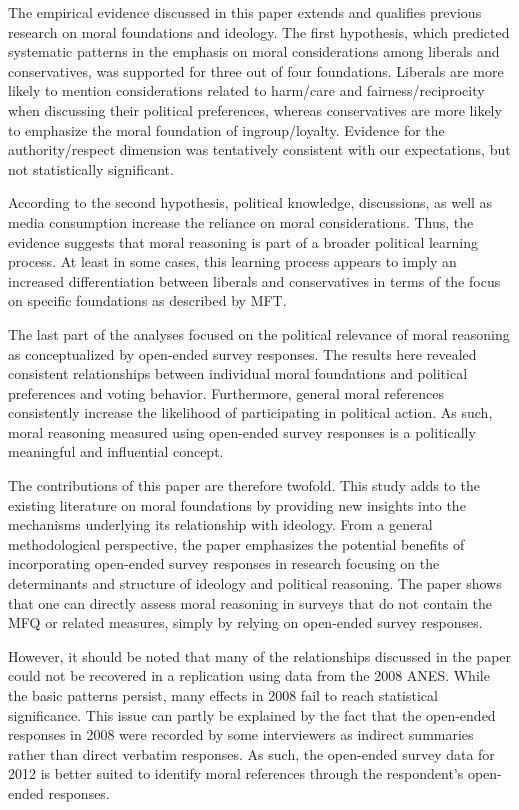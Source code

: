\documentclass[12pt]{article}
\begin{document}
The empirical evidence discussed in this paper extends and qualifies previous research on moral foundations and ideology. The first hypothesis, which predicted systematic patterns in the emphasis on moral considerations among liberals and conservatives, was supported for three out of four foundations. Liberals are more likely to mention considerations related to harm/care and fairness/reciprocity when discussing their political preferences, whereas conservatives are more likely to emphasize the moral foundation of ingroup/loyalty. Evidence for the authority/respect dimension was tentatively consistent with our expectations, but not statistically significant.

According to the second hypothesis, political knowledge, discussions, as well as media consumption increase the reliance on moral considerations. Thus, the evidence suggests that moral reasoning is part of a broader political learning process. At least in some cases, this learning process appears to imply an increased differentiation between liberals and conservatives in terms of the focus on specific foundations as described by MFT.

The last part of the analyses focused on the political relevance of moral reasoning as conceptualized by open-ended survey responses. The results here revealed consistent relationships between individual moral foundations and political preferences and voting behavior. Furthermore, general moral references consistently increase the likelihood of participating in political action. As such, moral reasoning measured using open-ended survey responses is a politically meaningful and influential concept.

The contributions of this paper are therefore twofold. This study adds to the existing literature on moral foundations by providing new insights into the mechanisms underlying its relationship with ideology. From a general methodological perspective, the paper emphasizes the potential benefits of incorporating open-ended survey responses in research focusing on the determinants and structure of ideology and political reasoning. The paper shows that one can directly assess moral reasoning in surveys that do not contain the MFQ or related measures, simply by relying on open-ended survey responses.

However, it should be noted that many of the relationships discussed in the paper could not be recovered in a replication using data from the 2008 ANES. While the basic patterns persist, many effects in 2008 fail to reach statistical significance. This issue can partly be explained by the fact that the open-ended responses in 2008 were recorded by some interviewers as indirect summaries rather than direct verbatim responses. As such, the open-ended survey data for 2012 is better suited to identify moral references through the respondent's open-ended responses.
\end{document}
